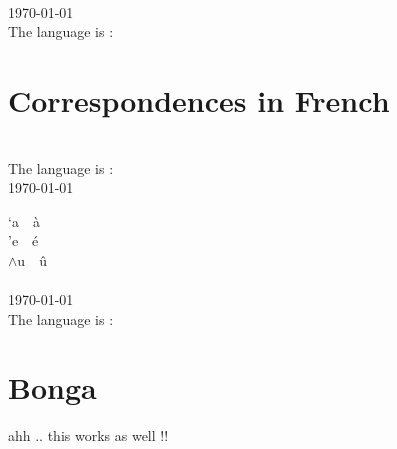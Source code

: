 \documentclass{article}
\begin{document}
\\
\today\\
The language is : 

\section{Correspondences in French}
\\
The language is : \\
\today\\
\newcommand{\LS}[1]{`#1~~\`#1}
\newcommand{\RS}[1]{'#1~~\'#1}
\newcommand{\HAT}[1]{$\wedge$#1~~\^#1}

\LS{a}\\
\RS{e}\\
\HAT{u}\\

\\
\today\\
The language is : 

\appendix

\section{Bonga}
ahh .. this works as well !!

\printindex
\end{document}
